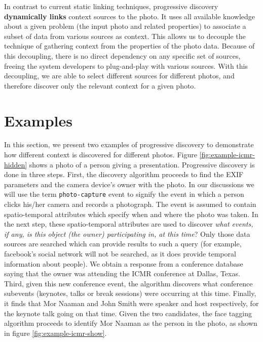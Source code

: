 In contrast to current static linking techniques, progressive discovery \textbf{dynamically links} context sources to the photo. It uses all available knowledge about a given problem (the input photo and related properties) to associate a subset of data from various sources as context. This allows us to decouple the technique of gathering context from the properties of the photo data. Because of this decoupling, there is no direct dependency on any specific set of sources, freeing the system developers to plug-and-play with various sources. With this decoupling, we are able to select different sources for different photos, and therefore discover only the relevant context for a given photo.



\section{Examples}
In this section, we present two examples of progressive discovery to demonstrate how different context is discovered for different photos. Figure \ref{fig:example-icmr-hidden} shows a photo of a person giving a presentation. Progressive discovery is done in three steps. First, the discovery algorithm proceeds to find the EXIF parameters and the camera device's owner with the photo. In our discussions we will use the term \texttt{photo-capture} event to signify the event in which a person clicks his/her camera and records a photograph. The event is assumed to contain spatio-temporal attributes which specify when and where the photo was taken. In the next step, these spatio-temporal attributes are used to discover \textit{what events, if any, is this object (the owner) participating in, at this time}? Only those data sources are searched which can provide results to such a query (for example, facebook's social network will not be searched, as it does provide temporal information about people). We obtain a response from a conference database saying that the owner was attending the ICMR conference at Dallas, Texas. Third, given this new conference event, the algorithm discovers what conference subevents (keynotes, talks or break sessions) were occurring at this time. Finally, it finds that Mor Naaman and John Smith were speaker and host respectively, for the keynote talk going on that time. Given the two candidates, the face tagging algorithm proceeds to identify Mor Naaman as the person in the photo, as shown in figure \ref{fig:example-icmr-show}.

